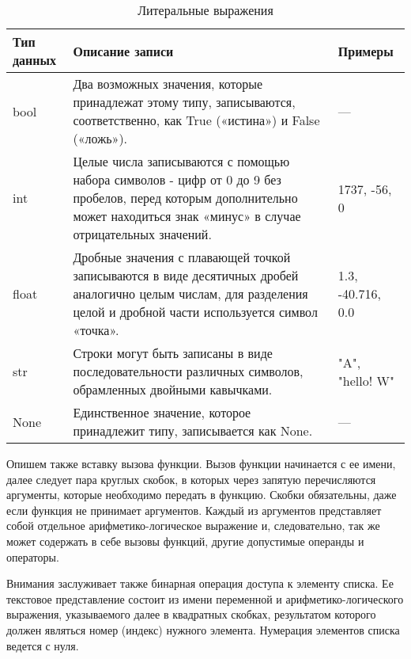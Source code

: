 \begin{table}[h]
    \centering
    \caption{Литеральные выражения}
    \label{tab:literals}
    \begin{tabular}{lp{8cm}p{4cm}}
        \toprule
        \textbf{Тип данных} & \textbf{Описание записи}                                                                                                                                                     & \textbf{Примеры}  \\
        \midrule
        bool                & Два возможных значения, которые принадлежат этому типу, записываются, соответственно, как True («истина») и False («ложь»).                                                  & ---               \\
        \addlinespace
        int                 & Целые числа записываются с помощью набора символов - цифр от 0 до 9 без пробелов, перед которым дополнительно может находиться знак «минус» в случае отрицательных значений. & 1737, -56, 0      \\
        \addlinespace
        float               & Дробные значения с плавающей точкой записываются в виде десятичных дробей аналогично целым числам, для разделения целой и дробной части используется символ «точка».         & 1.3, -40.716, 0.0 \\
        \addlinespace
        str                 & Строки могут быть записаны в виде последовательности различных символов, обрамленных двойными кавычками.                                                                     & "A", "hello! W"   \\
        \addlinespace
        None                & Единственное значение, которое принадлежит типу, записывается как None.                                                                                                      & ---               \\
        \bottomrule
    \end{tabular}
\end{table}

Опишем также вставку вызова функции.
Вызов функции начинается с ее имени, далее следует пара круглых скобок, в которых через запятую перечисляются аргументы, которые необходимо передать в функцию.
Скобки обязательны, даже если функция не принимает аргументов.
Каждый из аргументов представляет собой отдельное арифметико-логическое выражение и, следовательно, так же может содержать в себе вызовы функций, другие допустимые операнды и операторы.

Внимания заслуживает также бинарная операция доступа к элементу списка.
Ее текстовое представление состоит из имени переменной и арифметико-логического выражения, указываемого далее в квадратных скобках, результатом которого должен являться номер (индекс) нужного элемента.
Нумерация элементов списка ведется с нуля.

